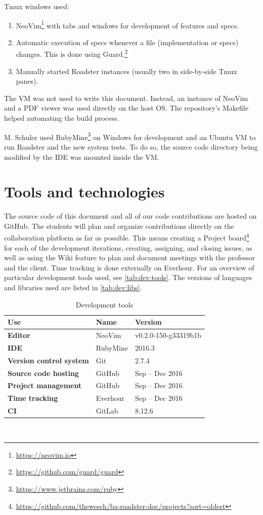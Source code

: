 \documentclass[a4paper]{report}
\begin{document}
Tmux windows used:
\begin{enumerate}
	\item NeoVim\footnote{\url{https://neovim.io}} with tabs and windows for development of features and specs.
	\item Automatic execution of specs whenever a file (implementation or
		specs) changes. This is done using
		Guard.\footnote{\url{https://github.com/guard/guard}}
	\item Manually started Roadster instances (usually two in side-by-side Tmux panes).
\end{enumerate}

The VM was not used to write this document. Instead, an instance of NeoVim and
a PDF viewer was used directly on the host OS. The repository's Makefile helped
automating the build process.

M. Schuler used RubyMine\footnote{\url{https://www.jetbrains.com/ruby}} on Windows for development and an Ubuntu VM to run
Roadster and the new system tests. To do so, the source code directory being
modified by the IDE was mounted inside the VM.

\section{Tools and technologies}
The source code of this document and all of our code contributions are hosted
on GitHub. The students will plan and organize contributions directly on the
collaboration platform as far as possible. This means creating a Project board\footnote{\url{https://github.com/thewesch/ba-roadster-doc/projects?sort=oldest}} for each of the
development iterations, creating, assigning, and closing issues, as well as using
the Wiki feature to plan and document meetings with the professor and the
client. Time tracking is done externally on Everhour. For an overview of
particular development tools used, see \autoref{tab:dev:tools}.
The versions of languages and libraries used are listed in \autoref{tab:dev:libs}.


\begin{table}[]
  \centering
  \begin{tabular}{|p{50mm}|p{35mm}|p{35mm}|}
    \hline
    \bf Use & \bf Name & \bf Version \\ \hline
    \bf Editor & NeoVim & v0.2.0-150-g33319b1b \\ \hline
    \bf IDE & RubyMine & 2016.3 \\ \hline
    \bf Version control system & Git & 2.7.4 \\ \hline
    \bf Source code hosting & GitHub & Sep -- Dec 2016 \\ \hline
    \bf Project management & GitHub & Sep -- Dec 2016 \\ \hline
    \bf Time tracking & Everhour & Sep -- Dec 2016 \\ \hline
    \bf CI & GitLab & 8.12.6 \\ \hline
  \end{tabular} \\
  \caption{Development tools}
  \label{tab:dev:tools}
\end{table}
\end{document}
